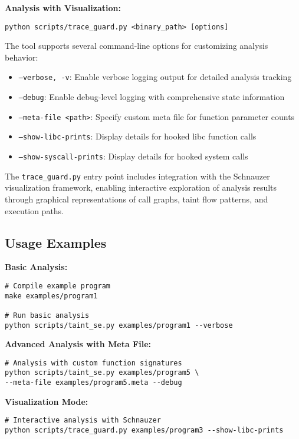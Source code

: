 \textbf{Analysis with Visualization:}
\begin{verbatim}
python scripts/trace_guard.py <binary_path> [options]
\end{verbatim}

The tool supports several command-line options for customizing analysis behavior:

\begin{itemize}
    \item \texttt{--verbose, -v}: Enable verbose logging output for detailed analysis tracking
    \item \texttt{--debug}: Enable debug-level logging with comprehensive state information
    \item \texttt{--meta-file <path>}: Specify custom meta file for function parameter counts
    \item \texttt{--show-libc-prints}: Display details for hooked libc function calls
    \item \texttt{--show-syscall-prints}: Display details for hooked system calls
\end{itemize}

The \texttt{trace\_guard.py} entry point includes integration with the Schnauzer visualization framework, enabling interactive exploration of analysis results through graphical representations of call graphs, taint flow patterns, and execution paths.

\subsection{Usage Examples}

\textbf{Basic Analysis:}
\begin{verbatim}
# Compile example program
make examples/program1

# Run basic analysis
python scripts/taint_se.py examples/program1 --verbose
\end{verbatim}

\textbf{Advanced Analysis with Meta File:}
\begin{verbatim}
# Analysis with custom function signatures
python scripts/taint_se.py examples/program5 \
--meta-file examples/program5.meta --debug
\end{verbatim}

\textbf{Visualization Mode:}
\begin{verbatim}
# Interactive analysis with Schnauzer
python scripts/trace_guard.py examples/program3 --show-libc-prints
\end{verbatim}


